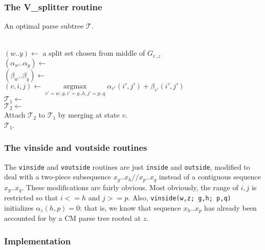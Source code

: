 \documentclass[11pt]{article}
\def\argmax{\mathop{\mathrm{argmax}}\limits}
\begin{document}
\subsubsection{The V\_splitter routine}
\begin{algorithm}
         {An optimal parse subtree $\mathcal{T}$.}

\begin{algtab*}
  \algreturn {}\\
\algelse
  $(w..y) \leftarrow$ a split set chosen from middle of $G_{r..z}$\\
  $(\alpha_w..\alpha_y) \leftarrow$ \\
  $(\beta_w..\beta_y)   \leftarrow$ \\
  $(v,i,j) \leftarrow \argmax_{v'=w..y, i'=g..h, j'=p..q} 
	\alpha_{v'}(i',j') + \beta_{v'}(i',j')$\\
  $\mathcal{T}_1 \leftarrow$ \\
  $\mathcal{T}_2 \leftarrow$ \\
  Attach $\mathcal{T}_2$ to $\mathcal{T}_1$ by merging at state $v$.\\
  \algreturn $\mathcal{T}_1$.\\
\algend
\end{algtab*}
\end{algorithm}

\subsubsection{The vinside and voutside routines}

The \texttt{vinside} and \texttt{voutside} routines are just
\texttt{inside} and \texttt{outside}, modified to deal with a
two-piece subsequence $x_g..x_h//x_p..x_q$ instead of a contiguous
sequence $x_g..x_q$. These modifications are fairly obvious.  Most
obviously, the range of $i,j$ is restricted so that $i<=h$ and $j>=p$.
Also, \texttt{vinside(w,z; g,h; p,q)} initializes $\alpha_z(h,p) = 0$:
that is, we know that sequence $x_h..x_p$ has already been accounted
for by a CM parse tree rooted at $z$. 

\subsubsection{Implementation}
\end{document}
